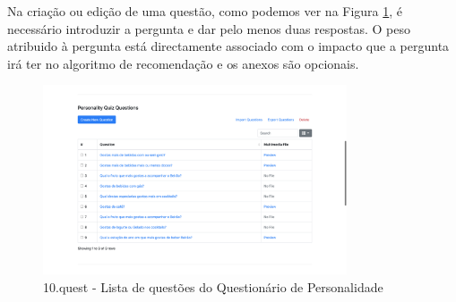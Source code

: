 Na criação ou edição de uma questão, como podemos ver na Figura \ref{fig:pq_questions}, é necessário introduzir a pergunta e dar pelo menos duas respostas. O peso atribuido à pergunta está directamente associado com o impacto que a pergunta irá ter no algoritmo de recomendação e os anexos são opcionais.

\begin{figure}[ht!]
	\begin{center}
		\includegraphics[width=0.8\textwidth]{img/product/pq_questions}
		\caption{10.quest - Lista de questões do Questionário de Personalidade}
		\label{fig:pq_questions}
	\end{center}
\end{figure}



